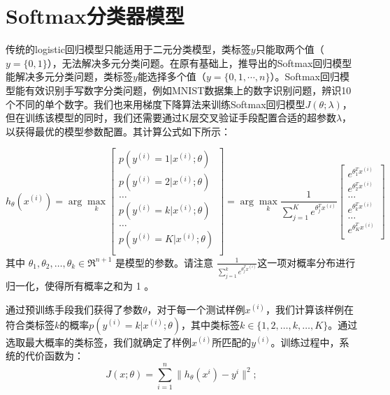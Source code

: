 \documentclass[oneside]{ZJUthesis}
\begin{document}
\section{Softmax分类器模型}
传统的logistic回归模型只能适用于二元分类模型，类标签$y$只能取两个值（$y=\{0,1\}$），无法解决多元分类问题。在原有基础上，推导出的Softmax回归模型能解决多元分类问题，类标签$y$能选择多个值（$y=\{0,1,\cdots,n\}$）\cite{Krizhevsky2012ImageNet}。Softmax回归模型能有效识别手写数字分类问题，例如MNIST数据集上的数字识别问题，辨识10个不同的单个数字。我们也来用梯度下降算法来训练Softmax回归模型$J(\theta;\lambda)$，但在训练该模型的同时，我们还需要通过K层交叉验证手段配置合适的超参数$\lambda$，以获得最优的模型参数配置。其计算公式如下所示：

\begin{equation}
\label{equ:softmax}
{h_\theta }({x^{(i)}}) =  \arg\max\limits_{k} \left[ {\begin{array}{*{20}{c}}
{p({y^{(i)}} = 1|{x^{(i)}};\theta )}\\
{p({y^{(i)}} = 2|{x^{(i)}};\theta )}\\
 \dots \\
{p({y^{(i)}} = k|{x^{(i)}};\theta )} \\
 \dots \\
{p({y^{(i)}} = K|{x^{(i)}};\theta )} \\
\end{array}} \right]=\arg\max\limits_{k} \frac{1}{\sum\limits_{j=1}^{K}{e^{\theta_j^Tx^{(i)}}}}\left[ {\begin{array}{*{20}{c}}
{e^{\theta_1^Tx^{(i)}}}\\
{e^{\theta_2^Tx^{(i)}}}\\
 \dots \\
{e^{\theta_k^Tx^{(i)}}}\\
 \dots \\
{e^{\theta_K^Tx^{(i)}}}\\
\end{array}} \right]
\end{equation}
其中 $\theta_1, \theta_2, \ldots, \theta_k \in \Re^{n+1}$ 是模型的参数。请注意 $\frac{1}{ \sum_{j=1}^{k}{e^{ \theta_j^T x^{(i)} }} } $这一项对概率分布进行归一化，使得所有概率之和为 1 。


通过预训练手段我们获得了参数$\theta$，对于每一个测试样例$x^{(i)}$，我们计算该样例在符合类标签$k$的概率$p({y^{(i)}} = k|{x^{(i)}};\theta )$，其中类标签$k \in \{1,2,\dots,k,\dots,K\}$。通过选取最大概率的类标签，我们就确定了样例$x^{(i)}$所匹配的$y^{(i)}$。训练过程中，系统的代价函数为：
\begin{equation}
	J(x;\theta)=\sum\limits_{i=1}^{n}{\|h_{\theta}(x^{i})-y^i\|^2};
\end{equation}
\end{document}
